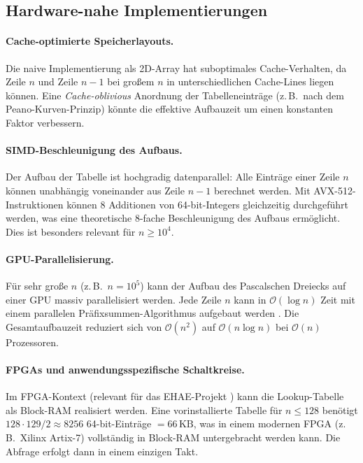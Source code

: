 ﻿\documentclass[12pt, a4paper]{article}
\newcommand{\Oh}{\mathcal{O}}
\theoremstyle{plain}
\theoremstyle{definition}
\theoremstyle{remark}
\renewcommand{\Oh}{\mathcal{O}}
\begin{document}
\subsection{Hardware-nahe Implementierungen}

\paragraph{Cache-optimierte Speicherlayouts.}
Die naive Implementierung als 2D-Array hat suboptimales Cache-Verhalten,
da Zeile $n$ und Zeile $n-1$ bei großem $n$ in unterschiedlichen
Cache-Lines liegen können. Eine \emph{Cache-oblivious} Anordnung der
Tabelleneinträge (z.\,B.\ nach dem Peano-Kurven-Prinzip) könnte die
effektive Aufbauzeit um einen konstanten Faktor verbessern.

\paragraph{SIMD-Beschleunigung des Aufbaus.}
Der Aufbau der Tabelle ist hochgradig datenparallel: Alle Einträge
einer Zeile $n$ können unabhängig voneinander aus Zeile $n-1$ berechnet
werden. Mit AVX-512-Instruktionen können 8 Additionen von 64-bit-Integers
gleichzeitig durchgeführt werden, was eine theoretische 8-fache
Beschleunigung des Aufbaus ermöglicht. Dies ist besonders relevant für
$n \ge 10^4$.

\paragraph{GPU-Parallelisierung.}
Für sehr große $n$ (z.\,B.\ $n = 10^5$) kann der Aufbau des
Pascalschen Dreiecks auf einer GPU massiv parallelisiert werden.
Jede Zeile $n$ kann in $\Oh(\log n)$ Zeit mit einem parallelen
Präfixsummen-Algorithmus aufgebaut werden \cite{ladner1980parallel}.
Die Gesamtaufbauzeit reduziert sich von $\Oh(n^2)$ auf $\Oh(n \log n)$
bei $\Oh(n)$ Prozessoren.

\paragraph{FPGAs und anwendungsspezifische Schaltkreise.}
Im FPGA-Kontext (relevant für das EHAE-Projekt \cite{epp2026ehae})
kann die Lookup-Tabelle als Block-RAM realisiert werden. Eine
vorinstallierte Tabelle für $n \le 128$ benötigt
$128 \cdot 129 / 2 \approx 8256$ 64-bit-Einträge $= 66\,\text{KB}$,
was in einem modernen FPGA (z.\,B.\ Xilinx Artix-7) vollständig
in Block-RAM untergebracht werden kann. Die Abfrage erfolgt dann in
einem einzigen Takt.
\end{document}
